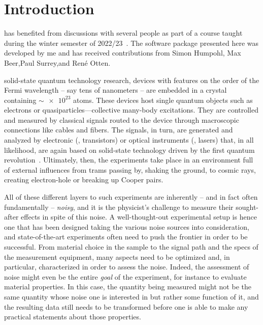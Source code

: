 \chapter{Introduction}\label{ch:speck:introduction}

\begin{partcontribs}
    \Thispart has benefited from discussions with several people as part of a course taught during the winter semester of 2022/23~.
    The software package presented here was developed by me and has received contributions from Simon Humpohl,\sidenote[a]{\RWTHFZJ}
    Max Beer,\sidenotemark[a] Paul Surrey,\sidenotemark[a] and René Otten.
\end{partcontribs}

 solid-state quantum technology research, devices with features on the order of the Fermi wavelength -- say tens of nanometers -- are embedded in a crystal containing $\sim\num{e23}$ atoms.
These devices host single quantum objects such as electrons or quasiparticles---collective many-body excitations.
They are controlled and measured by classical signals routed to the device through macroscopic connections like cables and fibers.
The signals, in turn, are generated and analyzed by electronic (\eg, transistors) or optical instruments (\eg, lasers) that, in all likelihood, are again based on solid-state technology driven by the first quantum revolution~\cite{Dowling2003,Aspect2024}.
Ultimately, then, the experiments take place in an environment full of external influences from trams passing by, shaking the ground, to cosmic rays, creating electron-hole or breaking up Cooper pairs.

All of these different layers to such experiments are inherently -- and in fact often fundamentally
-- \emph{noisy}, and it is the physicist's challenge to measure their sought-after effects in spite of this noise.
A well-thought-out experimental setup is hence one that has been designed taking the various noise sources into consideration, and state-of-the-art experiments often need to push the frontier in order to be successful.
From material choice in the sample to the signal path and the specs of the measurement equipment, many aspects need to be optimized and, in particular, characterized in order to assess the noise.
Indeed, the assessment of noise might even be the entire \emph{goal} of the experiment, for instance to evaluate material properties.
In this case, the quantity being measured might not be the same quantity whose noise one is interested in but rather some function of it, and the resulting data still needs to be transformed before one is able to make any practical statements about those properties.

